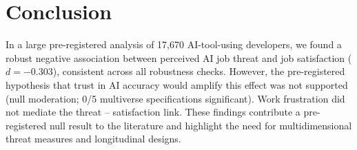 \documentclass[11pt]{article}
\begin{document}
\section{Conclusion}
In a large pre-registered analysis of 17,670 AI-tool-using developers, we found
a robust negative association between perceived AI job threat and job satisfaction
($d = -0.303$), consistent across all robustness checks. However, the pre-registered
hypothesis that trust in AI accuracy would amplify this effect was not supported
(null moderation; 0/5 multiverse specifications significant). Work frustration did
not mediate the threat -- satisfaction link. These findings contribute a pre-registered
null result to the literature and highlight the need for multidimensional threat
measures and longitudinal designs.
\end{document}

